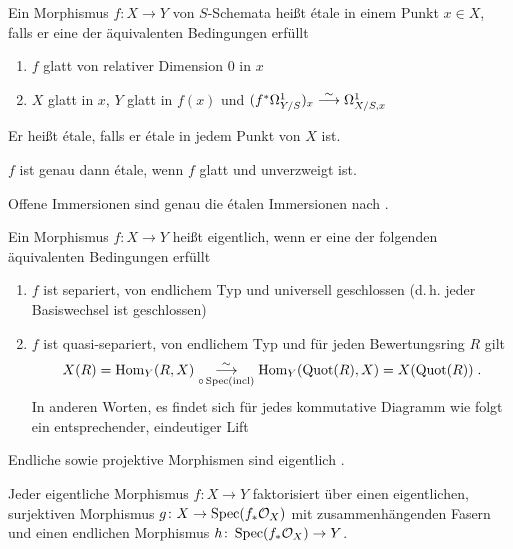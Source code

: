 \documentclass[german]{scrreprt}
\begin{document}
\begin{Definition}%
  Ein Morphismus $f\colon X\to Y$ von $S$-Schemata heißt étale in
  einem Punkt $x\in X$, falls er eine der äquivalenten Bedingungen
  erfüllt 
  \begin{enumerate}[label=(\roman*)]
  \item $f$ glatt von relativer Dimension 0 in $x$
  \item $X$ glatt in $x$, $Y$ glatt in $f(x)$ und 
    $(f^*\Omega_{Y/S}^1)_x \overset{\sim}{\longrightarrow} \Omega_{X/S,x}^1$
  \end{enumerate}
  Er heißt étale, falls er étale in jedem Punkt von $X$ ist.
  
  $f$ ist genau dann étale, wenn $f$ glatt und unverzweigt ist.

  Offene Immersionen sind genau die étalen Immersionen nach
  \cite[8.5, Lemma 7]{bosch}.
\end{Definition}

\begin{Definition}
  Ein Morphismus $f\colon X\to Y$ heißt eigentlich, wenn er eine der
  folgenden äquivalenten Bedingungen erfüllt
  \begin{enumerate}[label=(\roman*)]
  \item $f$ ist separiert, von endlichem Typ und universell
    geschlossen (d.\,h. jeder Basiswechsel ist geschlossen)
  \item $f$ ist quasi-separiert, von endlichem Typ und für jeden
    Bewertungsring $R$ gilt
    \begin{gather*}
      X(R)=\operatorname{Hom}_Y(R, X) 
      \overset{\sim}{\underset{\circ\operatorname{Spec}(\operatorname{incl})}
        {\longrightarrow}}
      \operatorname{Hom}_Y(\operatorname{Quot}(R), X)=X(\operatorname{Quot}(R))\;.
    \end{gather*}
    In anderen Worten, es findet sich für jedes kommutative Diagramm
    wie folgt ein entsprechender, eindeutiger Lift
    \begin{center}
    \end{center}
  \end{enumerate}
  Endliche sowie projektive Morphismen sind eigentlich
  \cite[9.5, Remark 5 und Theorem 9]{bosch}.

  \begin{Bemerkung}
    \cite[9.5, Theorem 12]{bosch}
    Jeder eigentliche Morphismus $f\colon X\to Y$ faktorisiert über
    einen eigentlichen, surjektiven Morphismus $g\colon X\to
    \operatorname{Spec}(f_*\mathcal{O}_X)$ mit zusammenhängenden Fasern und einen endlichen
    Morphismus $h\colon \operatorname{Spec}(f_*\mathcal{O}_X)\to Y$.
  \end{Bemerkung}
\end{Definition}
\end{document}
